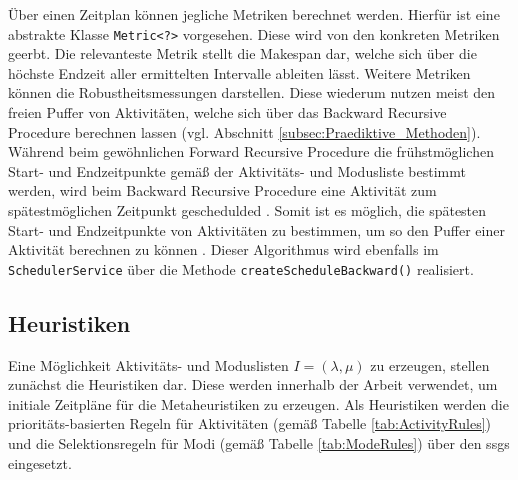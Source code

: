 Über einen Zeitplan können jegliche Metriken berechnet werden. Hierfür ist eine abstrakte Klasse \lstinline|Metric<?>| vorgesehen. Diese wird von den konkreten Metriken geerbt. Die relevanteste Metrik stellt die Makespan dar, welche sich über die höchste Endzeit aller ermittelten Intervalle ableiten lässt. Weitere Metriken können die Robustheitsmessungen darstellen. Diese wiederum nutzen meist den freien Puffer von Aktivitäten, welche sich über das Backward Recursive Procedure berechnen lassen (vgl. Abschnitt \ref{subsec:Praediktive_Methoden}). \\ 

Während beim gewöhnlichen Forward Recursive Procedure die frühstmöglichen Start- und Endzeitpunkte gemäß der Aktivitäts- und Modusliste bestimmt werden, wird beim Backward Recursive Procedure eine Aktivität zum spätestmöglichen Zeitpunkt geschedulded \cite[vgl][S. 181]{al-fawzan_bi-objective_2005}. Somit ist es möglich, die spätesten Start- und Endzeitpunkte von Aktivitäten zu bestimmen, um so den Puffer einer Aktivität berechnen zu können \cite[vgl][S. 181]{al-fawzan_bi-objective_2005}. Dieser Algorithmus wird ebenfalls im \lstinline|SchedulerService| über die Methode \lstinline|createScheduleBackward()| realisiert.

\subsection{Heuristiken}
Eine Möglichkeit Aktivitäts- und Moduslisten $I = (\lambda, \mu)$ zu erzeugen, stellen zunächst die Heuristiken dar. Diese werden innerhalb der Arbeit verwendet, um initiale Zeitpläne für die Metaheuristiken zu erzeugen. Als Heuristiken werden die prioritäts-basierten Regeln für Aktivitäten (gemäß Tabelle \ref{tab:ActivityRules}) und die Selektionsregeln für Modi (gemäß Tabelle \ref{tab:ModeRules}) über den \ac{ssgs} eingesetzt. \\

